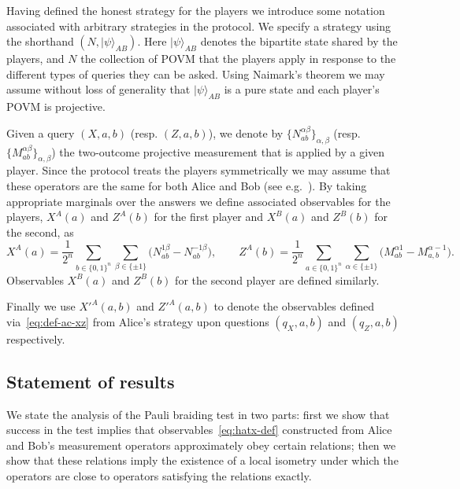 \documentclass[11pt,letterpaper]{article}
\newcommand{\<}{\langle}
\renewcommand{\>}{\rangle}
\newcommand{\ket}[1]{| #1 \>}
\begin{document}
Having defined the honest strategy for the players we introduce some notation associated with arbitrary strategies in the protocol. We  specify a strategy using the shorthand $(N,\ket{\psi}_{AB})$. Here $\ket{\psi}_{AB}$ denotes the bipartite state shared by the players, and $N$ the collection of POVM that the players apply in response to the different types of queries they can be asked. Using Naimark's theorem we may assume without loss of generality that $\ket{\psi}_{AB}$ is a pure state and each player's POVM is projective. 

Given a query $(X,a,b)$ (resp. $(Z,a,b)$), we denote by $\{N_{ab}^{\alpha\beta}\}_{\alpha,\beta}$ (resp. $\{M_{ab}^{\alpha\beta}\}_{\alpha,\beta}$) the two-outcome projective measurement that is applied by a given player.
Since the protocol treats the players symmetrically we may assume that these operators are the same for both Alice and Bob (see e.g.~\cite[Lemma~2.5]{Vidick13xor}).
By taking appropriate marginals over the answers we define associated observables for the players, $X^A(a)$ and $Z^A(b)$ for the first player and $X^B(a)$ and $Z^B(b)$ for the second, as 
\begin{equation}\label{eq:hatx-def}
X^A(a) = \frac{1}{2^n}\sum_{b\in\{0,1\}^n} \sum_{\beta\in \{\pm1\}} \big(N_{ab}^{1\beta}-N_{ab}^{-1\beta}\big), \qquad Z^A(b) = \frac{1}{2^n}\sum_{a\in\{0,1\}^n} \sum_{\alpha\in \{\pm1\}} \big(M_{ab}^{\alpha1}-M_{a,b}^{\alpha-1}\big).
\end{equation}
Observables $X^B(a)$ and $Z^B(b)$ for the second player are defined similarly. 

Finally we use ${X'}^A(a,b)$ and ${Z'}^A(a,b)$ to denote the observables defined via~\eqref{eq:def-ac-xz} from Alice's strategy upon questions $(q_X,a,b)$ and $(q_Z,a,b)$ respectively. 


\subsection{Statement of results}
\label{sec:twoplayer}

We state the analysis of the Pauli braiding test in two parts: first
we show that success in the test implies that observables~\eqref{eq:hatx-def} constructed from Alice and Bob's measurement operators approximately obey certain relations; then we show that these relations imply the existence of a local isometry under which the operators are close to operators satisfying the relations exactly.  
\end{document}
